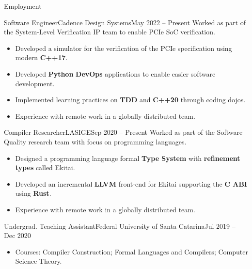 \documentclass[calibri]{mcdowellcv}
\begin{document}
	\begin{cvsection}{Employment}
		\begin{cvsubsection}{Software Engineer}{Cadence Design Systems}{May 2022 -- Present}
			Worked as part of the System-Level Verification IP team to enable PCIe SoC verification.
			\begin{itemize}
				\item Developed a simulator for the verification of the PCIe specification using modern \textbf{C++17}.
				\item Developed \textbf{Python} \textbf{DevOps} applications to enable easier software development.
				\item Implemented learning practices on \textbf{TDD} and \textbf{C++20} through coding dojos.
				\item Experience with remote work in a globally distributed team.
			\end{itemize}
		\end{cvsubsection}

		\begin{cvsubsection}{Compiler Researcher}{LASIGE}{Sep 2020 -- Present}
			Worked as part of the Software Quality research team with focus on programming languages.
			\begin{itemize}
				\item Designed a programming language formal \textbf{Type System} with \textbf{refinement types} called Ekitai.
				\item Developed an incremental \textbf{LLVM} front-end for Ekitai supporting the \textbf{C ABI} using \textbf{Rust}.
				\item Experience with remote work in a globally distributed team.
			\end{itemize}
		\end{cvsubsection}

		\begin{cvsubsection}{Undergrad. Teaching Assistant}{Federal University of Santa Catarina}{Jul 2019 -- Dec 2020}
			\begin{itemize}
				\item Courses: Compiler Construction; Formal Languages and Compilers; Computer Science Theory.
			\end{itemize}
		\end{cvsubsection}


\end{cvsection}
\end{document}
